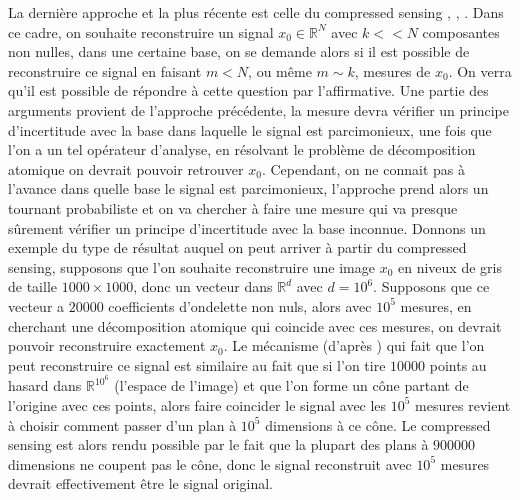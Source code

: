 La dernière approche et la plus récente est celle du compressed sensing \cite{DonohoCS}, \cite{CandesTaoUniv}, \cite{CandesSparsityIncoherence}. 
Dans ce cadre, on souhaite reconstruire un signal $x_0 \in \mathbb{R}^N$ avec $k << N$ composantes non nulles, dans une certaine base, on se demande alors si il est possible de reconstruire ce signal en faisant $m<N$, ou même $m\sim k$, mesures de $x_0$.
On verra qu'il est possible de répondre à cette question par l'affirmative.
Une partie des arguments provient de l'approche précédente, la mesure devra vérifier un principe d'incertitude avec la base dans laquelle le signal est parcimonieux, une fois que l'on a un tel opérateur d'analyse, en résolvant le problème de décomposition atomique on devrait pouvoir retrouver $x_0$.
Cependant, on ne connait pas à l'avance dans quelle base le signal est parcimonieux, l'approche prend alors un tournant probabiliste et on va chercher à faire une mesure qui va presque sûrement vérifier un principe d'incertitude avec la base inconnue.
\newline
Donnons un exemple du type de résultat auquel on peut arriver à partir du compressed sensing, supposons que l'on souhaite reconstruire une image $x_0$ en niveux de gris de taille $1000\times1000$, donc un vecteur dans $\mathbb{R}^d$ avec $d=10^6$. 
Supposons que ce vecteur a $20 000$ coefficients d'ondelette non nuls, alors avec $10^5$ mesures, en cherchant une décomposition atomique qui coincide avec ces mesures, on devrait pouvoir reconstruire exactement $x_0$.
Le mécanisme (d'après \cite{DonohoForMost}) qui fait que l'on peut reconstruire ce signal est similaire au fait que si l'on tire $10 000$ points au hasard dans $\mathbb{R}^{10^6}$ (l'espace de l'image) et que l'on forme un cône partant de l'origine avec ces points, alors faire coincider le signal avec les $10^5$ mesures revient à choisir comment passer d'un plan à $10^5$ dimensions à ce cône.
Le compressed sensing est alors rendu possible par le fait que la plupart des plans à $900 000$ dimensions ne coupent pas le cône, donc le signal reconstruit avec $10^5$ mesures devrait effectivement être le signal original.

